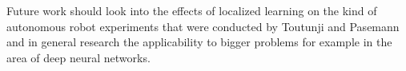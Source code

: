 \documentclass[12pt,twoside]{scrartcl}
\theoremstyle{plain}
\theoremstyle{definition}
\theoremstyle{remark}
\begin{document}
Future work should look into the effects of localized learning on the kind of
autonomous robot experiments that were conducted by Toutunji and Pasemann and
in general research the applicability to bigger problems for example in the area
of deep neural networks.

%
%
\newpage
\printbibliography
{}%
\end{document}
